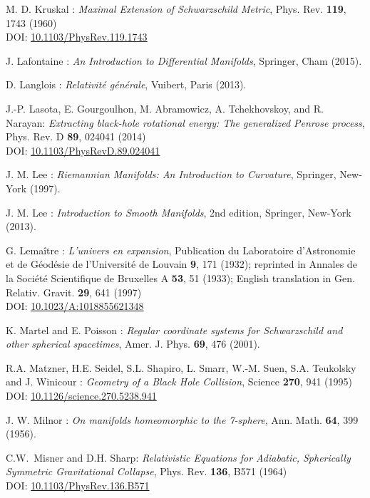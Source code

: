 \begin{thebibliography}{123}
M. D. Kruskal :
{\em Maximal Extension of Schwarzschild Metric},
Phys. Rev. {\bf 119}, 1743 (1960)\\
DOI: \href{https://doi.org/10.1103/PhysRev.119.1743}{10.1103/PhysRev.119.1743}

J. Lafontaine : {\em An Introduction to Differential Manifolds},
Springer, Cham (2015).

D. Langlois : \emph{Relativit\'e g\'en\'erale},
Vuibert, Paris (2013).

J.-P. Lasota, E. Gourgoulhon, M. Abramowicz, A. Tchekhovskoy,
and R. Narayan:
{\em Extracting black-hole rotational energy: The generalized Penrose process},
Phys. Rev. D {\bf 89}, 024041 (2014)  \\
DOI: \href{https://doi.org/10.1103/PhysRevD.89.024041}{10.1103/PhysRevD.89.024041}

J. M. Lee : {\em Riemannian Manifolds: An Introduction to Curvature},
Springer, New-York (1997).

J. M. Lee : {\em Introduction to Smooth Manifolds}, 2nd edition,
Springer, New-York (2013).

G. Lemaître : {\em L'univers en expansion},
Publication du Laboratoire d'Astronomie et de Géodésie de l'Université
de Louvain {\bf 9},  171 (1932); reprinted in
Annales de la Société Scientifique de Bruxelles A {\bf 53}, 51 (1933);
English translation in
Gen. Relativ. Gravit. {\bf 29}, 641 (1997)\\
DOI: \href{http://dx.doi.org/10.1023/A:1018855621348}{10.1023/A:1018855621348}

K. Martel and E. Poisson :
\emph{Regular coordinate systems for Schwarzschild and other spherical spacetimes},
Amer. J. Phys. {\bf 69}, 476 (2001).

R.A. Matzner, H.E. Seidel, S.L. Shapiro, L. Smarr, W.-M. Suen, S.A. Teukolsky and
J. Winicour : {\em Geometry of a Black Hole Collision},
Science {\bf 270}, 941 (1995)\\
DOI: \href{http://dx.doi.org/10.1126/science.270.5238.941}{10.1126/science.270.5238.941}

J. W. Milnor : {\em On manifolds homeomorphic to the 7-sphere},
Ann. Math. {\bf 64}, 399 (1956).

C.W.~Misner and D.H. Sharp:
{\em Relativistic Equations for Adiabatic, Spherically Symmetric Gravitational Collapse},
Phys. Rev. {\bf 136}, B571 (1964)\\
DOI: \href{http://dx.doi.org/10.1103/PhysRev.136.B571}{10.1103/PhysRev.136.B571}


\end{thebibliography}
